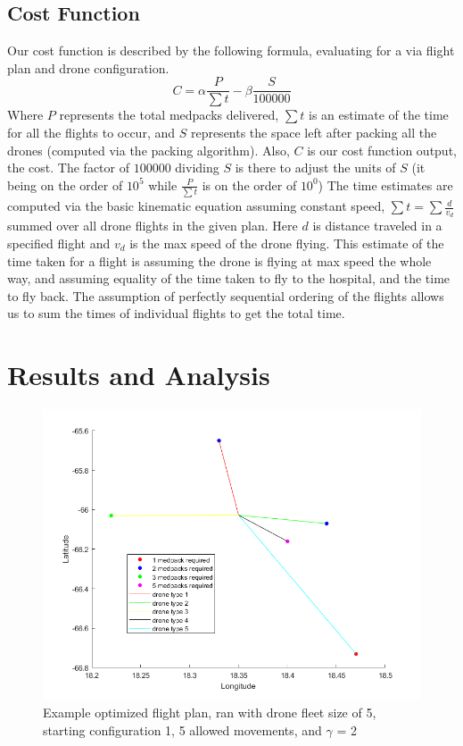 \documentclass[twocolumn,10pt]{asme2ej}
\begin{document}
\subsection{Cost Function}
Our cost function is described by the following formula, evaluating for a via flight plan and drone configuration.
\[
C = \alpha \frac{P}{\sum{t}} - \beta \frac{S}{100000}
\]
Where $P$ represents the total medpacks delivered, $\sum{t}$ is an estimate of the time for all the flights to occur, and $S$ represents the space left after packing all the drones (computed via the packing algorithm). Also, $C$ is our cost function output, the cost. The factor of $100000$ dividing $S$ is there to adjust the units of $S$ (it being on the order of $10^5$ while $\frac{P}{\sum{t}}$ is on the order of $10^0$) The time estimates are computed via the basic kinematic equation assuming constant speed, $\sum{t}=\sum{\frac{d}{v_d}}$ summed over all drone flights in the given plan. Here $d$ is distance traveled in a specified flight and $v_d$ is the max speed of the drone flying. This estimate of the time taken for a flight is assuming the drone is flying at max speed the whole way, and assuming equality of the time taken to fly to the hospital, and the time to fly back. The assumption of perfectly sequential ordering of the flights allows us to sum the times of individual flights to get the total time.

\section{Results and Analysis}
\begin{figure}
	\centering
	\includegraphics[width=0.7\linewidth]{../example_flight_plan}
	\caption[Fig 1.]{Example optimized flight plan, ran with drone fleet size of 5, starting configuration 1, 5 allowed movements, and $\gamma$ = 2}
	\label{Fig 1.}
\end{figure}
\end{document}
